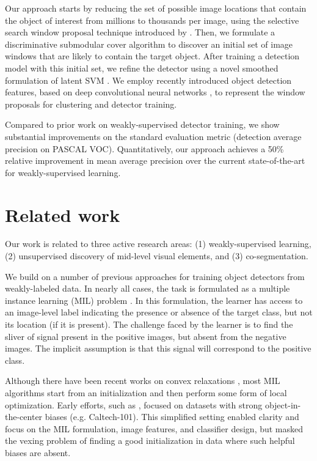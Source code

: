 \documentclass{article}
\begin{document}
Our approach starts by reducing the set of possible image locations that contain the object of interest from millions to thousands per image, using the selective search window proposal technique introduced by \citet{selectivesearch}. Then, we formulate a  discriminative submodular cover algorithm to discover an initial set of image windows that are likely to contain the target object. After training a detection model with this initial set, we refine the detector using a novel smoothed formulation of latent SVM \cite{misvm-nips,lsvm-pami}. We employ recently introduced object detection features, based on deep convolutional neural networks \cite{decafICML,girshick2014rcnn}, to represent the window proposals for clustering and detector training.

Compared to prior work on weakly-supervised detector training, we show substantial improvements on the standard evaluation metric (detection average precision on PASCAL VOC). Quantitatively, our approach achieves a 50\% relative improvement in mean average precision over the current state-of-the-art for weakly-supervised learning.

\section{Related work}

Our work is related to three active research areas: (1) weakly-supervised learning, (2) unsupervised discovery of mid-level visual elements, and (3) co-segmentation.

We build on a number of previous approaches for training object detectors from weakly-labeled data.
In nearly all cases, the task is formulated as a multiple instance learning (MIL) problem \cite{mil3}.
In this formulation, the learner has access to an image-level label indicating the presence or absence of the target class, but not its location (if it is present).
The challenge faced by the learner is to find the sliver of signal present in the positive images, but absent from the negative images.
The implicit assumption is that this signal will correspond to the positive class.

Although there have been recent works on convex relaxations \cite{li13, bach12}, most MIL algorithms start from an initialization and then perform some form of local optimization.
Early efforts, such as \cite{perona1,perona2,galleguillos2008weakly,fergus2007weakly,crandall2006weakly,chum2007exemplar, neil13}, focused on datasets with strong object-in-the-center biases (e.g. Caltech-101).
This simplified setting enabled clarity and focus on the MIL formulation, image features, and classifier design, but masked the vexing problem of finding a good initialization in data where such helpful biases are absent.
\end{document}
